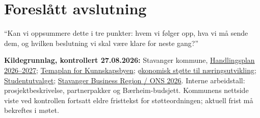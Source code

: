 \documentclass[10pt,a4paper]{article}
\begin{document}
\section{Foreslått avslutning}

``Kan vi oppsummere dette i tre punkter: hvem vi følger opp, hva vi må sende dem, og hvilken beslutning vi skal være klare for neste gang?''

{\scriptsize\color{muted}
\textbf{Kildegrunnlag, kontrollert 27.08.2026:}
Stavanger kommune, \href{https://www.stavanger.kommune.no/naring-og-arbeidsliv/handlingsplan-for-naring-og-internasjonalt-samarbeid-2026-2027/}{Handlingsplan 2026--2027};
\href{https://www.stavanger.kommune.no/naring-og-arbeidsliv/kunnskapsbyenStavanger/temaplan-for-kunnskapsbyen/}{Temaplan for Kunnskapsbyen};
\href{https://www.stavanger.kommune.no/naring-og-arbeidsliv/midler-til-naringsutvikling/}{økonomisk støtte til næringsutvikling};
\href{https://www.stavanger.kommune.no/politikk/politiske-utvalg-i-stavanger/studentutvalget/}{Studentutvalget};
\href{https://www.stavanger.kommune.no/Stavangerbusinessregion/artikler/ons-2026/}{Stavanger Business Region / ONS 2026}.
Interne arbeidstall: prosjektbeskrivelse, partnerpakker og Bærheim-budsjett. Kommunens nettside viste ved kontrollen fortsatt eldre fristtekst for støtteordningen; aktuell frist må bekreftes i møtet.}
\end{document}
